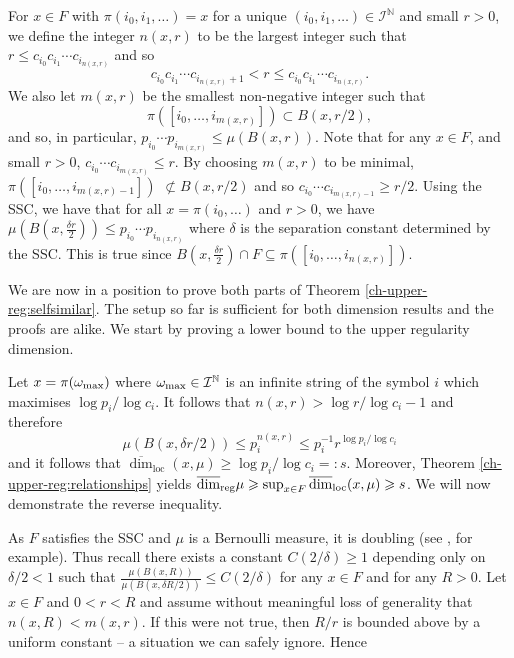 For $x\in F$ with $\pi(i_0, i_1, \dots)=x$ for a unique $(i_0,i_1,\dots) \in \mathcal{I}^\mathbb{N}$ and small $r>0$, we define the integer $n(x,r)$ to be the largest integer such that $r \le c_{i_0}c_{i_1} \cdots c_{i_{n(x,r)}}$ and so
\[
c_{i_0}c_{i_1} \cdots c_{i_{n(x,r)}+1} < r \le c_{i_0}c_{i_1} \cdots c_{i_{n(x,r)}}.
\]
We also let $m(x,r)$ be the smallest non-negative  integer such that 
$$
\pi([i_0,\ldots, i_{m(x,r)}])\subset B(x,r/2),
$$
and so, in particular,  $p_{i_0}\cdots p_{i_{m(x,r)}} \le \mu (B(x,r))$.  Note that for any $x \in F$, and small $ r>0$,  $c_{i_0} \cdots c_{i_{m(x,r)}} \leq r$. By choosing $m(x,r)$ to be minimal,  $\pi([i_0,\ldots, i_{m(x,r)-1}])$ $\not\subset B(x,r/2)$ and so $c_{i_0} \cdots c_{i_{m(x,r)-1}} \ge r/2$. Using the SSC, we have that for all $x=\pi(i_0,\ldots)$ and  $r>0$, we have $\mu(B(x,\frac{\delta r}{2}))\le p_{i_0}\cdots p_{i_{n(x,r)}}$ where $\delta$ is the separation constant determined by the SSC. This is true since $B(x, \frac{\delta r}{2}) \cap F  \subseteq \pi([i_0,\ldots, i_{n(x,r)}])$.

We are now in a position to prove both parts of Theorem \ref{ch-upper-reg:selfsimilar}. The setup so far is sufficient for both dimension results and the proofs are alike. We start by proving a lower bound to the upper regularity dimension.

Let $x = \pi(\omega_\textup{max})$ where $\omega_\textup{max} \in \mathcal{I}^{\mathbb{N}}$ is an infinite string of the symbol  $i$ which maximises $\log p_i/\log c_i$. It follows that $n(x,r) > \log r / \log {c_i} - 1$ and therefore
\[
\mu(B(x,\delta r/2)) \le p_{i}^{n(x,r)} \leq p_i^{-1} r^{\log p_i/\log c_i}
\]
and it follows that $\overline{\dim}_{\text{loc}}(x,\mu) \geq \log p_i/\log c_i = \colon s$.  Moreover, Theorem \ref{ch-upper-reg:relationships} yields  $ \overline{\dim}_{\textup{reg}} \mu  \geqslant \sup_{x\in F} \overline{\dim}_{\text{loc}}(x,\mu) \geqslant  s$.  We will now demonstrate the reverse inequality. 





As $F$ satisfies the SSC and $\mu$ is a Bernoulli measure, it is doubling (see \cite{olsenformalism}, for example). Thus recall there exists a constant $C(2/\delta) \geq 1$ depending only on $\delta/2 < 1$ such that $\frac{\mu(B(x, R))}{\mu(B(x,\delta R/2))}\le C(2/\delta)$ for any $x\in F$ and for any $R>0$.  Let $x \in F$ and $0<r<R$ and assume without meaningful loss of generality that $n(x,R) < m(x,r)$. If this were not true, then $R/r$ is bounded above by a uniform constant -- a situation we can safely ignore.  Hence

